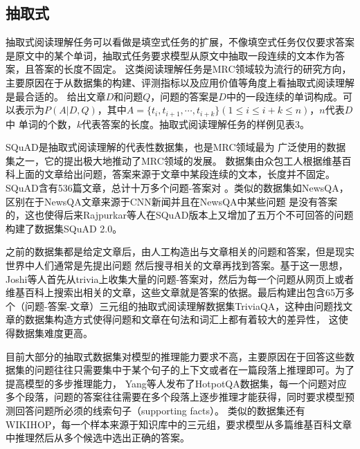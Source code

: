 \subsection{抽取式}
抽取式阅读理解任务可以看做是填空式任务的扩展，不像填空式任务仅仅要求答案是原文中的某个单词，抽取式任务要求模型从原文中抽取一段连续的文本作为答案，且答案的长度不固定。
这类阅读理解任务是MRC领域较为流行的研究方向，主要原因在于从数据集的构建、评测指标以及应用价值等角度上看抽取式阅读理解是最合适的。
给出文章$D$和问题$Q$，问题的答案是$D$中的一段连续的单词构成。可以表示为$P(A|D,Q)$，其中$A=\{t_i,t_{i+1},\cdots,t_{i+k}\}(1\leq i\leq i+k\leq n)$，$n$代表$D$中
单词的个数，$k$代表答案的长度。抽取式阅读理解任务的样例见表3。

SQuAD是抽取式阅读理解的代表性数据集，也是MRC领域最为
广泛使用的数据集之一，它的提出极大地推动了MRC领域的发展。
数据集由众包工人根据维基百科上面的文章给出问题，答案来源于文章中某段连续的文本，长度并不固定。
SQuAD含有536篇文章，总计十万多个问题-答案对
。类似的数据集如NewsQA，区别在于NewsQA文章来源于CNN新闻并且在NewsQA中某些问题
是没有答案的，这也使得后来Rajpurkar等人在SQuAD版本上又增加了五万个不可回答的问题构建了数据集SQuAD 2.0。

之前的数据集都是给定文章后，由人工构造出与文章相关的问题和答案，但是现实世界中人们通常是先提出问题
然后搜寻相关的文章再找到答案。基于这一思想，Joshi等人首先从trivia上收集大量的问题-答案对，然后为每一个问题从网页上或者维基百科上搜索出相关的文章，这些文章就是答案的依据。最后构建出包含65万多个（问题-答案-文章）三元组的抽取式阅读理解数据集TriviaQA，这种由问题找文章的数据集构造方式使得问题和文章在句法和词汇上都有着较大的差异性，
这使得数据集难度更高。

目前大部分的抽取式数据集对模型的推理能力要求不高，主要原因在于回答这些数据集的问题往往只需要集中于某个句子的上下文或者在一篇段落上推理即可。为了提高模型的多步推理能力，
Yang等人发布了HotpotQA数据集，每一个问题对应多个段落，问题的答案往往需要在多个段落上逐步推理才能获得，同时要求模型预测回答问题所必须的线索句子（supporting facts）。
类似的数据集还有WIKIHOP，每一个样本来源于知识库中的三元组，要求模型从多篇维基百科文章中推理然后从多个候选中选出正确的答案。

